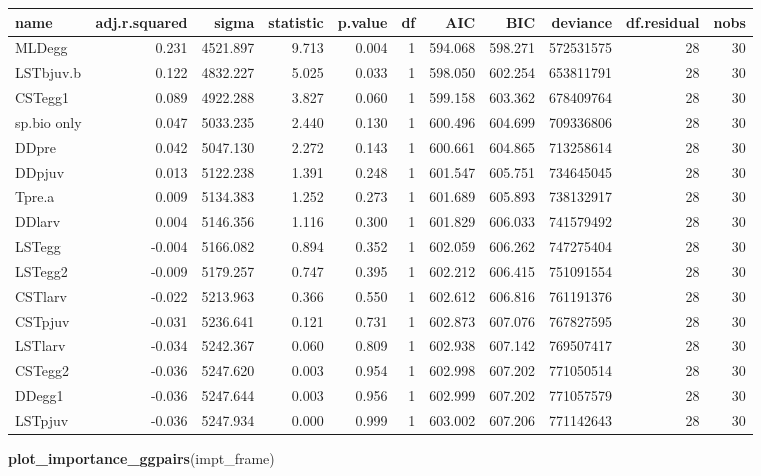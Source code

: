 \documentclass[
]{article}
\newenvironment{Shaded}{\begin{snugshade}}{\end{snugshade}}
\newcommand{\KeywordTok}[1]{\textcolor[rgb]{0.13,0.29,0.53}{\textbf{#1}}}
\newcommand{\NormalTok}[1]{#1}
\begin{document}
\begin{longtable}[]{@{}lrrrrrrrrrr@{}}
\toprule
name & adj.r.squared & sigma & statistic & p.value & df & AIC & BIC &
deviance & df.residual & nobs\tabularnewline
\midrule
\endhead
MLDegg & 0.231 & 4521.897 & 9.713 & 0.004 & 1 & 594.068 & 598.271 &
572531575 & 28 & 30\tabularnewline
LSTbjuv.b & 0.122 & 4832.227 & 5.025 & 0.033 & 1 & 598.050 & 602.254 &
653811791 & 28 & 30\tabularnewline
CSTegg1 & 0.089 & 4922.288 & 3.827 & 0.060 & 1 & 599.158 & 603.362 &
678409764 & 28 & 30\tabularnewline
sp.bio only & 0.047 & 5033.235 & 2.440 & 0.130 & 1 & 600.496 & 604.699 &
709336806 & 28 & 30\tabularnewline
DDpre & 0.042 & 5047.130 & 2.272 & 0.143 & 1 & 600.661 & 604.865 &
713258614 & 28 & 30\tabularnewline
DDpjuv & 0.013 & 5122.238 & 1.391 & 0.248 & 1 & 601.547 & 605.751 &
734645045 & 28 & 30\tabularnewline
Tpre.a & 0.009 & 5134.383 & 1.252 & 0.273 & 1 & 601.689 & 605.893 &
738132917 & 28 & 30\tabularnewline
DDlarv & 0.004 & 5146.356 & 1.116 & 0.300 & 1 & 601.829 & 606.033 &
741579492 & 28 & 30\tabularnewline
LSTegg & -0.004 & 5166.082 & 0.894 & 0.352 & 1 & 602.059 & 606.262 &
747275404 & 28 & 30\tabularnewline
LSTegg2 & -0.009 & 5179.257 & 0.747 & 0.395 & 1 & 602.212 & 606.415 &
751091554 & 28 & 30\tabularnewline
CSTlarv & -0.022 & 5213.963 & 0.366 & 0.550 & 1 & 602.612 & 606.816 &
761191376 & 28 & 30\tabularnewline
CSTpjuv & -0.031 & 5236.641 & 0.121 & 0.731 & 1 & 602.873 & 607.076 &
767827595 & 28 & 30\tabularnewline
LSTlarv & -0.034 & 5242.367 & 0.060 & 0.809 & 1 & 602.938 & 607.142 &
769507417 & 28 & 30\tabularnewline
CSTegg2 & -0.036 & 5247.620 & 0.003 & 0.954 & 1 & 602.998 & 607.202 &
771050514 & 28 & 30\tabularnewline
DDegg1 & -0.036 & 5247.644 & 0.003 & 0.956 & 1 & 602.999 & 607.202 &
771057579 & 28 & 30\tabularnewline
LSTpjuv & -0.036 & 5247.934 & 0.000 & 0.999 & 1 & 603.002 & 607.206 &
771142643 & 28 & 30\tabularnewline
\bottomrule
\end{longtable}

\begin{Shaded}
\begin{Highlighting}[]
\KeywordTok{plot\_importance\_ggpairs}\NormalTok{(impt\_frame)}
\end{Highlighting}
\end{Shaded}
\end{document}
